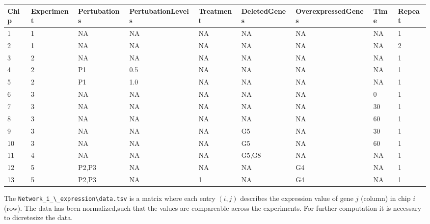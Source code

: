 
\begin{table}[H]
\scriptsize
\centering
\begin{tabularx}{\textwidth}{lllllllll} 
\hline\hline
Chip & Experiment &  Pertubations &  PertubationLevels &  Treatment &  DeletedGenes &  OverexpressedGenes &  Time &  Repeat\\
\hline \hline
1 & 1 &	NA & NA & NA & NA & NA & NA & 1\\\hline
2 &	1 &	NA & NA & NA & NA &	NA & NA & 2\\\hline
3 &	2 & NA & NA & NA & NA & NA & NA & 1\\\hline
4 &	2 &	P1 & 0.5 & NA & NA & NA & NA & 1\\\hline
5 &	2 &	P1 & 1.0 & NA & NA & NA & NA & 1\\\hline
6 &	3 &	NA & NA & NA & NA & NA & 0 & 1\\\hline
7 &	3 &	NA & NA & NA & NA & NA & 30 & 1\\\hline
8 &	3 &	NA & NA & NA & NA & NA & 60 & 1\\\hline
9 &	3 &	NA & NA & NA & G5 & NA & 30 & 1\\\hline
10 & 3 & NA & NA & NA & G5 & NA & 60 & 1\\\hline
11 & 4 & NA & NA & NA & G5,G8 & NA & NA & 1\\\hline
12 & 5 & P2,P3 & NA & NA & NA & G4 & NA & 1\\\hline
13 & 5 & P2,P3 & NA & 1 & NA & G4 & NA & 1\\
\hline
\end{tabularx}
\label{table:Table 2}
\end{table}

The \texttt{Network{\_}i{\_}\textbackslash{\_}expression\textbackslash data.tsv} is a matrix where each entry $(i,j)$ describes the expression value of gene $j$ (column) in chip $i$ (row). The data has been normalized,such that the values are compareable across the experiments. For further computation it is necessary to dicretesize the data.




